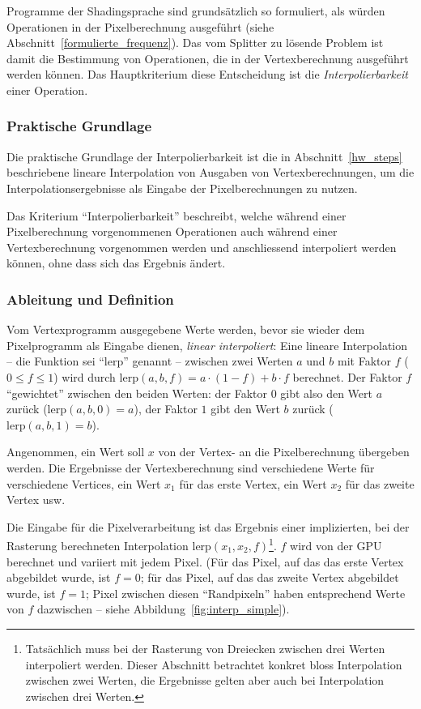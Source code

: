 \documentclass[twoside,a4paper,fleqn,12pt]{book}
\begin{document}
Programme der Shadingsprache sind grundsätzlich so formuliert, als würden Operationen in der Pixelberechnung ausgeführt (siehe Abschnitt~\ref{formulierte_frequenz}).
Das vom Splitter zu lösende Problem ist damit die Bestimmung von Operationen, die in der Vertexberechnung ausgeführt werden können.
Das Hauptkriterium diese Entscheidung ist die \emph{Interpolierbarkeit} einer Operation.

\subsubsection{Praktische Grundlage}

Die praktische Grundlage der Interpolierbarkeit ist die in Abschnitt~\ref{hw_steps} beschriebene lineare Interpolation von Ausgaben
von Vertexberechnungen, um die Interpolationsergebnisse als Eingabe der Pixelberechnungen zu nutzen.

Das Kriterium "`Interpolierbarkeit"' beschreibt, welche während einer Pixelberechnung vorgenommenen Operationen
auch während einer Vertexberechnung vorgenommen werden und anschliessend interpoliert werden können, ohne dass sich das Ergebnis ändert.

\subsubsection{Ableitung und Definition}
\newcommand\lerp{\mathrm{lerp}}
Vom Vertexprogramm ausgegebene Werte werden, bevor sie wieder dem Pixelprogramm als Eingabe dienen, \emph{linear interpoliert}: %
Eine lineare Interpolation -- die Funktion sei "`$\lerp$"' genannt -- zwischen zwei Werten $a$ und $b$ mit Faktor $f$ ($0 \le f \le 1$) wird durch $\lerp(a, b, f) = a \cdot (1-f) + b \cdot f$ berechnet.
Der Faktor $f$ "`gewichtet"' zwischen den beiden Werten: der Faktor $0$ gibt also den Wert $a$ zurück ($\lerp(a, b, 0) = a$),
der Faktor $1$ gibt den Wert $b$ zurück ($\lerp(a, b, 1) = b$).

Angenommen, ein Wert soll $x$ von der Vertex- an die Pixelberechnung übergeben werden.
Die Ergebnisse der Vertexberechnung sind verschiedene Werte für verschiedene Vertices, ein Wert $x_1$ für das erste Vertex, ein Wert $x_2$ für das zweite Vertex usw.

Die Eingabe für die Pixelverarbeitung ist das Ergebnis einer implizierten, bei der Rasterung berechneten Interpolation $\lerp(x_1, x_2, f)$\footnote{Tatsächlich muss bei der Rasterung von Dreiecken zwischen drei Werten interpoliert werden. Dieser Abschnitt betrachtet konkret
bloss Interpolation zwischen zwei Werten, die Ergebnisse gelten aber auch bei Interpolation zwischen drei Werten.}.
$f$ wird von der GPU berechnet und variiert mit jedem Pixel. (Für das Pixel, auf das das erste Vertex abgebildet wurde, ist $f = 0$; für das Pixel,
auf das das zweite Vertex abgebildet wurde, ist $f = 1$; Pixel zwischen diesen "`Randpixeln"' haben entsprechend Werte von $f$ dazwischen -- siehe Abbildung~\ref{fig:interp_simple}).
\end{document}
